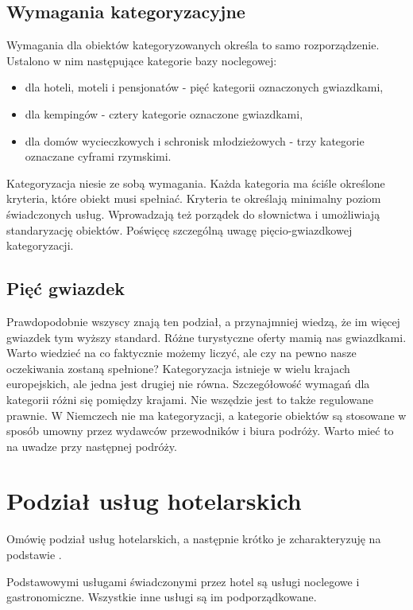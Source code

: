 \documentclass[a4paper,onecolumn,oneside,11pt,wide,floatssmall]{mwrep}
\theoremstyle{definition}
\theoremstyle{plain}%
\theoremstyle{remark}
\begin{document}
\subsection{Wymagania kategoryzacyjne}
Wymagania dla obiektów kategoryzowanych określa to samo rozporządzenie. 
Ustalono w nim następujące kategorie bazy noclegowej:

\begin{itemize}
  \item dla hoteli, moteli i pensjonatów - pięć kategorii oznaczonych 
  gwiazdkami,
  \item dla kempingów - cztery kategorie oznaczone gwiazdkami,
  \item dla domów wycieczkowych i schronisk młodzieżowych - trzy kategorie 
  oznaczane cyframi rzymskimi.
\end{itemize}

Kategoryzacja niesie ze sobą wymagania. Każda kategoria ma ściśle określone 
kryteria, które obiekt musi spełniać. Kryteria te określają minimalny poziom 
świadczonych usług. Wprowadzają też porządek do słownictwa i umożliwiają 
standaryzację obiektów. Poświęcę szczególną uwagę pięcio-gwiazdkowej 
kategoryzacji.

\subsection{Pięć gwiazdek}
Prawdopodobnie wszyscy znają ten podział, a przynajmniej wiedzą, że im 
więcej gwiazdek tym wyższy standard. Różne turystyczne oferty mamią nas 
gwiazdkami. Warto wiedzieć na co faktycznie możemy liczyć, ale czy na pewno 
nasze oczekiwania zostaną spełnione? Kategoryzacja istnieje w wielu krajach 
europejskich, ale jedna jest drugiej nie równa. Szczegółowość wymagań dla 
kategorii różni się pomiędzy krajami. Nie wszędzie jest to także regulowane 
prawnie. W Niemczech nie ma kategoryzacji, a kategorie obiektów są stosowane 
w sposób umowny przez wydawców przewodników i biura podróży. Warto mieć to 
na uwadze przy następnej podróży.

\section{Podział usług hotelarskich}   
Omówię podział usług hotelarskich, a następnie krótko je zcharakteryzuję na 
podstawie \cite[8-10]{OrgaDzialHot}.

Podstawowymi usługami świadczonymi przez hotel są usługi noclegowe i 
gastronomiczne. Wszystkie inne usługi są im podporządkowane.
\end{document}
